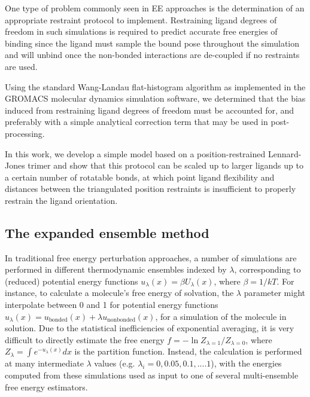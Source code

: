 \documentclass[%
 aip,
rsi,%
 amsmath,amssymb,
 reprint,%
]{revtex4-1}
\begin{document}
One type of problem commonly seen in EE approaches is the determination of an appropriate restraint protocol to implement. Restraining ligand degrees of freedom in such simulations is required to predict accurate free energies of binding since the ligand must sample the bound pose throughout the simulation and will unbind once the non-bonded interactions are de-coupled if no restraints are used.

Using the standard Wang-Landau flat-histogram algorithm as implemented in the GROMACS molecular dynamics simulation software, we determined that the bias induced from restraining ligand degrees of freedom must be accounted for, and preferably with a simple analytical correction term that may be used in post-processing.

In this work, we develop a simple model based on a position-restrained Lennard-Jones trimer and show that this protocol can be scaled up to larger ligands up to a certain number of rotatable bonds, at which point ligand flexibility and distances between the triangulated position restraints is insufficient to properly restrain the ligand orientation.

\subsection*{The expanded ensemble method}

In traditional free energy perturbation approaches, a number of simulations are performed in different thermodynamic ensembles indexed by $\lambda$, corresponding to (reduced) potential energy functions $u_{\lambda}(x) = \beta U_{\lambda}(x)$, where $\beta = 1/kT$.  For instance, to calculate a molecule's free energy of solvation, the $\lambda$ parameter might interpolate between 0 and 1 for potential energy functions $u_{\lambda}(x) = u_{\text{bonded}}(x) + \lambda u_{\text{nonbonded}}(x)$, for a simulation of the molecule in solution.  Due to the statistical inefficiencies of exponential averaging, it is very difficult to directly estimate the free energy $f = -\ln Z_{\lambda=1}/Z_{\lambda=0}$, where $Z_{\lambda} = \int e^{-u_{\lambda}(x)} dx$ is the partition function.  Instead,  the calculation is performed at many intermediate $\lambda$ values (e.g. $\lambda_i = 0, 0.05, 0.1, .... 1$), with the energies computed from these simulations used as input to one of several multi-ensemble free energy estimators.\cite{shirts2008statistically, TI} 
\end{document}
